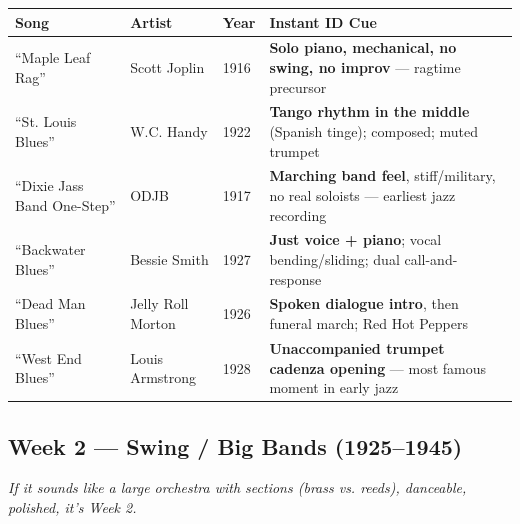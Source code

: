 \documentclass[11pt,letterpaper]{article}
\begin{document}
\begin{small}
\begin{tabularx}{\textwidth}{p{3.3cm} p{2.8cm} p{0.7cm} X}
\toprule
\textbf{Song} & \textbf{Artist} & \textbf{Year} & \textbf{Instant ID Cue} \\
\midrule
``Maple Leaf Rag'' & Scott Joplin & 1916 & \textbf{Solo piano, mechanical, no swing, no improv} --- ragtime precursor \\
``St. Louis Blues'' & W.C. Handy & 1922 & \textbf{Tango rhythm in the middle} (Spanish tinge); composed; muted trumpet \\
``Dixie Jass Band One-Step'' & ODJB & 1917 & \textbf{Marching band feel}, stiff/military, no real soloists --- earliest jazz recording \\
``Backwater Blues'' & Bessie Smith & 1927 & \textbf{Just voice + piano}; vocal bending/sliding; dual call-and-response \\
``Dead Man Blues'' & Jelly Roll Morton & 1926 & \textbf{Spoken dialogue intro}, then funeral march; Red Hot Peppers \\
``West End Blues'' & Louis Armstrong & 1928 & \textbf{Unaccompanied trumpet cadenza opening} --- most famous moment in early jazz \\
\bottomrule
\end{tabularx}
\end{small}

\subsection{\textcolor{week2color}{Week 2 --- Swing / Big Bands (1925--1945)}}
\emph{If it sounds like a large orchestra with sections (brass vs. reeds), danceable, polished, it's Week 2.}
\end{document}

